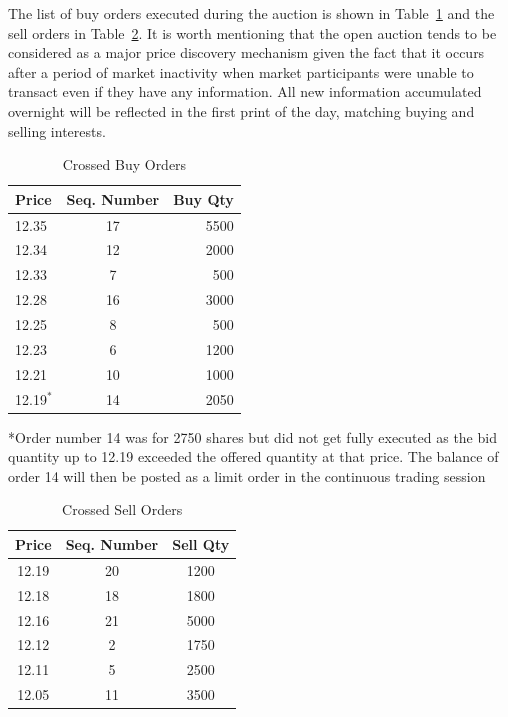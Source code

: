 The list of buy orders executed during the auction is shown in Table~\ref{tab:openAuct4} and the sell orders in Table~\ref{tab:openAuct5}. It is worth mentioning that the open auction tends to be considered as a major price discovery mechanism given the fact that it occurs after a period of market inactivity when market participants were unable to transact even if they have any information. All new information accumulated overnight will be reflected in the first print of the day, matching buying and selling interests.  


\begin{table}[!ht]
   \centering
   \caption{Crossed Buy Orders \label{tab:openAuct4}}
   \begin{tabular}{lcr} 
	Price & Seq. Number & Buy Qty  \\ \hline
	12.35 &  17 & 5500 \\
	12.34 & 12 & 2000\\	
	12.33 & 7  & 500\\			
	12.28 &  16 & 3000\\	
	12.25 & 8 & 500\\	
	12.23 & 6 & 1200\\		
	12.21  & 10& 1000\\		
	12.19$^*$ &  14  & 2050 		
   \end{tabular}
\begin{minipage}[t]{1\textwidth}
\small{*Order number 14 was for 2750 shares but did not get fully executed as the bid quantity up to 12.19 exceeded the offered quantity at that price. The balance of order 14 will then be posted as a limit order in the continuous trading session}
\end{minipage}   
\end{table}

	
\begin{table}[!ht]
   \centering
   \caption{Crossed Sell Orders\label{tab:openAuct5}}
   \hspace*{-3.3cm}
   \begin{tabular}{ccc} 
	Price & Seq. Number & Sell Qty  \\ \hline
	12.19 &  20 & 1200 \\
	12.18 &  18 & 1800 \\
	12.16 &  21 & 5000 \\
	12.12 & 2 & 1750 \\		
	12.11 & 5 & 2500 \\				
	12.05 & 11 & 3500 		
   \end{tabular}
\end{table}	


